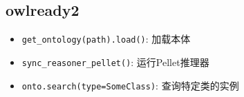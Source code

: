\subsection{owlready2}
\begin{itemize}
\item \texttt{get\_ontology(path).load()}: 加载本体
\item \texttt{sync\_reasoner\_pellet()}: 运行Pellet推理器
\item \texttt{onto.search(type=SomeClass)}: 查询特定类的实例
\end{itemize}
